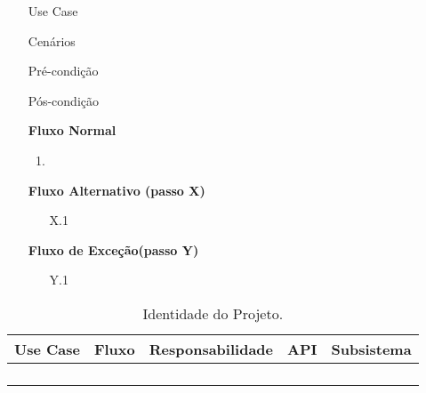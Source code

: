 \documentclass[../relatorio.tex]{subfiles}
\begin{document}
\begin{itemize}
    \item[Use Case] {\underline{}}
    \item[Cenários] {}
    \item[Pré-condição] {}
    \item[Pós-condição] {}
          \begin{flushleft}
              \textbf{Fluxo Normal}
          \end{flushleft}
          \begin{enumerate}
              \item
          \end{enumerate}
          \begin{flushleft}
              \textbf{Fluxo Alternativo (passo X)}
          \end{flushleft}
          \begin{itemize}
              \item[X.1]{}
          \end{itemize}
          \begin{flushleft}
              \textbf{Fluxo de Exceção(passo Y)}
          \end{flushleft}

          \begin{itemize}
              \item[Y.1]{}
          \end{itemize}
\end{itemize}
\begin{landscape}
    \begin{table}[!h]
        \centering
        \begin{tabular}{|p{5cm}|p{1cm}|p{4cm}|p{6cm}|p{3cm}|}
            \hline
            \rowcolor{gray!20!white}
            Use Case & Fluxo & Responsabilidade & API & Subsistema \\
            \hline
            \rowcolor{yellow}
                     &
                     &
                     &
                     &
            \\
            \hline
                     &
                     &
                     &
                     &
            \\
            \hline
                     &
                     &
                     &
                     &
            \\
            \hline
                     &
                     &
                     &
                     &
            \\
        \end{tabular}
        \caption{Identidade do Projeto.}
    \end{table}
\end{landscape}
\end{document}

